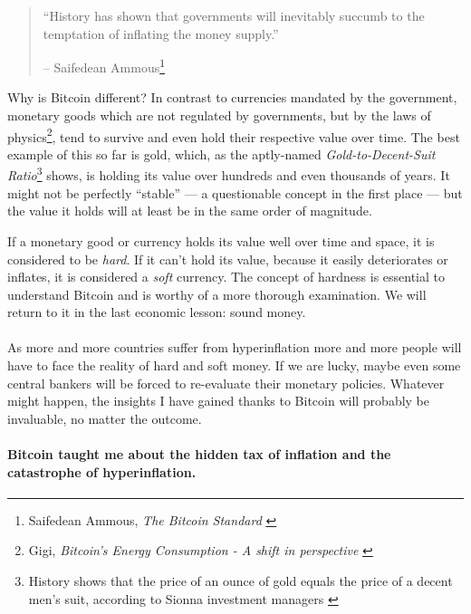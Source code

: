 \begin{quotation}\begin{samepage}
\enquote{History has shown that governments will inevitably succumb to the
temptation of inflating the money supply.}
\begin{flushright} -- Saifedean Ammous\footnote{Saifedean Ammous, \textit{The Bitcoin
Standard} \cite{bitcoin-standard}}
\end{flushright}\end{samepage}\end{quotation}

\newpage

Why is Bitcoin different? In contrast to currencies mandated by the government,
monetary goods which are not regulated by governments, but by the laws of
physics\footnote{Gigi, \textit{Bitcoin's Energy Consumption - A shift in
perspective} \cite{gigi:energy}}, tend to survive and even hold their respective
value over time. The best example of this so far is gold, which, as the
aptly-named \textit{Gold-to-Decent-Suit Ratio}\footnote{History shows that the
price of an ounce of gold equals the price of a decent men's suit, according to Sionna
investment managers \cite{web:gold-to-decent-suite-ratio}} shows, is holding its
value over hundreds and even thousands of years. It might not be perfectly
\enquote{stable} --- a questionable concept in the first place --- but the value it
holds will at least be in the same order of magnitude.

If a monetary good or currency holds its value well over time and space,
it is considered to be \textit{hard}. If it can't hold its value, because it
easily deteriorates or inflates, it is considered a \textit{soft} currency. The
concept of hardness is essential to understand Bitcoin and is worthy of
a more thorough examination. We will return to it in the last economic
lesson: sound money.

\paragraph{}
As more and more countries suffer from
hyperinflation more and more people will have to face the reality
of hard and soft money. If we are lucky, maybe even some central bankers will be
forced to re-evaluate their monetary policies. Whatever might happen, the
insights I have gained thanks to Bitcoin will probably be invaluable, no matter
the outcome.

\paragraph{Bitcoin taught me about the hidden tax of inflation and the catastrophe
of hyperinflation.}

